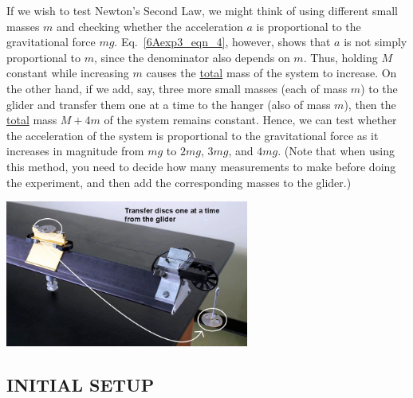 If we wish to test Newton's Second Law, we might think of using different small masses \(m\) and checking whether the acceleration \(a\) is proportional to the gravitational force \(mg\).  Eq.~\ref{6Aexp3_eqn_4}, however, shows that \(a\) is not simply proportional to \(m\), since the denominator also depends on \(m\).  Thus, holding \(M\) constant while increasing \(m\) causes the \ul{total} mass of the system to increase.  On the other hand, if we add, say, three more small masses (each of mass \(m\)) to the glider and transfer them one at a time to the hanger (also of mass \(m\)), then the \ul{total} mass \(M + 4m\) of the system remains constant.  Hence, we can test whether the acceleration of the system is proportional to the gravitational force as it increases in magnitude from \(mg\) to \(2mg\), \(3mg\), and \(4mg\).  (Note that when using this method, you need to decide how many measurements to make before doing the experiment, and then add the corresponding masses to the glider.)
\begin{center} \includegraphics*[width=0.6\textwidth]{imgs/6labs/6Alab/6Aexp3/6A-EXP3transferglidersn_wht.jpg} \end{center}

\subsection*{INITIAL SETUP}

